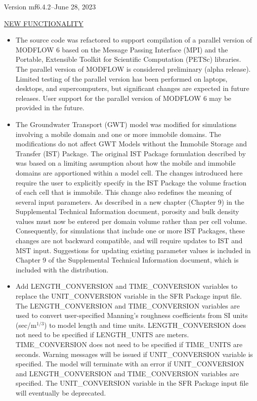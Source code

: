 	
	\item Version mf6.4.2--June 28, 2023
	
	\underline{NEW FUNCTIONALITY}
	\begin{itemize}
		\item The source code was refactored to support compilation of a parallel version of MODFLOW 6 based on the Message Passing Interface (MPI) and the Portable, Extensible Toolkit for Scientific Computation (PETSc) libraries.  The parallel version of MODFLOW is considered preliminary (alpha release). Limited testing of the parallel version has been performed on laptops, desktops, and supercomputers, but significant changes are expected in future releases. User support for the parallel version of MODFLOW 6 may be provided in the future.
		\item The Groundwater Transport (GWT) model was modified for simulations involving a mobile domain and one or more immobile domains.  The modifications do not affect GWT Models without the Immobile Storage and Transfer (IST) Package.  The original IST Package formulation described by \cite{modflow6gwt} was based on a limiting assumption about how the mobile and immobile domains are apportioned within a model cell.  The changes introduced here require the user to explicitly specify in the IST Package the volume fraction of each cell that is immobile.  This change also redefines the meaning of several input parameters.  As described in a new chapter (Chapter 9) in the Supplemental Technical Information document, porosity and bulk density values must now be entered per domain volume rather than per cell volume.  Consequently, for simulations that include one or more IST Packages, these changes are not backward compatible, and will require updates to IST and MST input.  Suggestions for updating existing parameter values is included in Chapter 9 of the Supplemental Technical Information document, which is included with the distribution.
		\item Add LENGTH\_CONVERSION and TIME\_CONVERSION variables to replace the UNIT\_CONVERSION variable in the SFR Package input file. The LENGTH\_CONVERSION and TIME\_CONVERSION variables are used to convert user-specified Manning's roughness coefficients from SI units (sec/m$^{1/3}$) to model length and time units. LENGTH\_CONVERSION does not need to be specified if LENGTH\_UNITS are meters. TIME\_CONVERSION does not need to be specified if TIME\_UNITS are seconds. Warning messages will be issued if UNIT\_CONVERSION variable is specified. The model will terminate with an error if UNIT\_CONVERSION and LENGTH\_CONVERSION and TIME\_CONVERSION variables are specified. The UNIT\_CONVERSION variable in the SFR Package input file will eventually be deprecated. 

\end{itemize}

